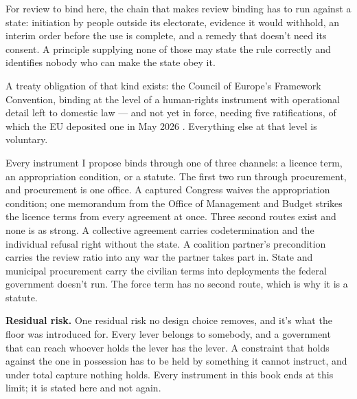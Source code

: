 For review to bind here, the chain that makes review binding has to run against a state: initiation by people outside its electorate, evidence it would withhold, an interim order before the use is complete, and a remedy that doesn't need its consent. A principle supplying none of those may state the rule correctly and identifies nobody who can make the state obey it.

A treaty obligation of that kind exists: the Council of Europe's Framework Convention, binding at the level of a human-rights instrument with operational detail left to domestic law \autocite{coe2024framework} — and not yet in force, needing five ratifications, of which the EU deposited one in May 2026 \autocite{coe2026euratifies}. Everything else at that level is voluntary.

Every instrument I propose binds through one of three channels: a licence term, an appropriation condition, or a statute. The first two run through procurement, and procurement is one office. A captured Congress waives the appropriation condition; one memorandum from the Office of Management and Budget strikes the licence terms from every agreement at once. Three second routes exist and none is as strong. A collective agreement carries codetermination and the individual refusal right without the state. A coalition partner's precondition carries the review ratio into any war the partner takes part in. State and municipal procurement carry the civilian terms into deployments the federal government doesn't run. The force term has no second route, which is why it is a statute.

\textbf{Residual risk.} One residual risk no design choice removes, and it's what the floor was introduced for. Every lever belongs to somebody, and a government that can reach whoever holds the lever has the lever. A constraint that holds against the one in possession has to be held by something it cannot instruct, and under total capture nothing holds. Every instrument in this book ends at this limit; it is stated here and not again.
